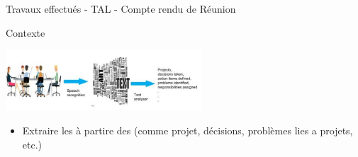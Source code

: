 \documentclass{beamer}
\newcommand{\imp}[1]{{\color{red}{#1}}}
\begin{document}
{{%
%
%   
%


\begin{frame}{Travaux effectués - TAL - Compte rendu de Réunion }
\vspace{-0.3cm}
\begin{block}{Contexte}
	\begin{center}
     \includegraphics[width=0.55\textwidth]{images/reus-image} \\
	\end{center}
\vspace{-0.5cm}
\begin{itemize}
\item Extraire les \imp{informations importants} à partire des \imp{transcriptions de réunions} (comme projet, décisions, problèmes lies a projets, etc.)
\end{itemize}
\end{block}



\end{frame}}}
\end{document}
